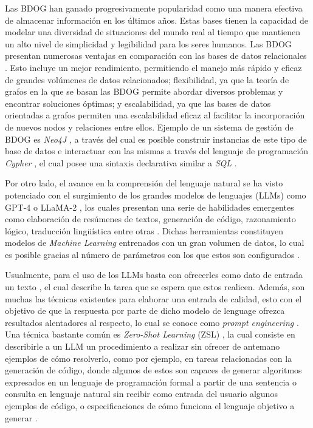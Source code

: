 Las BDOG han ganado progresivamente popularidad como una manera efectiva de almacenar información en los últimos años. Estas bases tienen la capacidad de modelar una diversidad de situaciones del mundo real al tiempo que mantienen un alto nivel de simplicidad y legibilidad para los seres humanos. Las BDOG presentan numerosas ventajas en comparación con las bases de datos relacionales \cite{graphdbs}. Esto incluye un mejor rendimiento, permitiendo el manejo más rápido y eficaz de grandes volúmenes de datos relacionados; flexibilidad, ya que la teoría de grafos en la que se basan las BDOG permite abordar diversos problemas y encontrar soluciones óptimas; y escalabilidad, ya que las bases de datos orientadas a grafos permiten una escalabilidad eficaz al facilitar la incorporación de nuevos nodos y relaciones entre ellos. Ejemplo de un sistema de gestión de BDOG es \textit{Neo4J} \cite{neo4j}, a través del cual es posible construir instancias de este tipo de base de datos e interactuar con las mismas a través del lenguaje de programación \textit{Cypher} \cite{cypher}, el cual posee una sintaxis declarativa similar a \textit{SQL} \cite{sqllang}.

Por otro lado, el avance en la comprensión del lenguaje natural se ha visto potenciado con el surgimiento de los grandes modelos de lenguajes (LLMs) \cite{llmsoverview} como GPT-4 \cite{gpt4} o LLaMA-2 \cite{llama2}, los cuales presentan una serie de habilidades emergentes como elaboración de resúmenes de textos, generación de código, razonamiento lógico, traducción lingüística entre otras \cite{llmsskills}. Dichas herramientas constituyen modelos de \textit{Machine Learning} entrenados con un gran volumen de datos, lo cual es posible gracias al número de parámetros con los que estos son configurados \cite{llmsoverview}. 

Usualmente, para el uso de los LLMs basta con ofrecerles como dato de entrada un texto \cite{llmsoverview}, el cual describe la tarea que se espera que estos realicen. Además, son muchas las técnicas existentes para elaborar una entrada de calidad, esto con el objetivo de que la respuesta por parte de dicho modelo de lenguage ofrezca resultados alentadores al respecto, lo cual se conoce como \textit{prompt engineering} \cite{promptengineering}. Una técnica bastante común es \textit{Zero-Shot Learning} (ZSL) \cite{zeroshotlearning}, la cual consiste en describirle a un LLM un procedimiento a realizar sin ofrecer de antemano ejemplos de cómo resolverlo, como por ejemplo, en tareas relacionadas con la generación de código, donde algunos de estos son capaces de generar algoritmos expresados en un lenguaje de programación formal a partir de una sentencia o consulta en lenguaje natural sin recibir como entrada del usuario algunos ejemplos de código, o especificaciones de cómo funciona el lenguaje objetivo a generar \cite{text2code1} \cite{text2code2}. 

